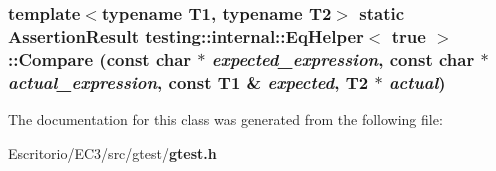 \subsubsection{\setlength{\rightskip}{0pt plus 5cm}template$<$typename T1, typename T2$>$ static {\bf AssertionResult} {\bf testing::internal::EqHelper}$<$ true $>$::Compare (const char $\ast$ {\em expected\_\-expression}, const char $\ast$ {\em actual\_\-expression}, const T1 \& {\em expected}, T2 $\ast$ {\em actual})\hspace{0.3cm}{\tt  [inline, static]}}\label{classtesting_1_1internal_1_1EqHelper_3_01true_01_4_fca81649a11ff352e877756d6954b0be}




The documentation for this class was generated from the following file:\begin{CompactItemize}
\item 
Escritorio/EC3/src/gtest/{\bf gtest.h}\end{CompactItemize}

